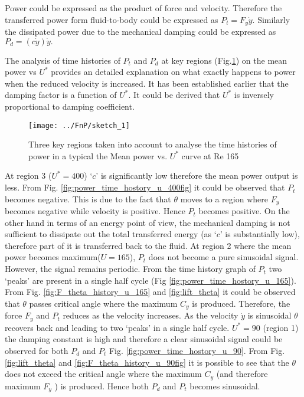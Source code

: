  
 
 
 
 Power could be expressed as the product of force and velocity. Therefore the transferred power form fluid-to-body could be expressed as $P_t=F_y\dot{y}$. Similarly the dissipated power due to the mechanical damping could be expressed as $P_d=(c\dot{y})\dot{y}.$

The analysis of time histories of $P_t $ and $P_d$ at key regions (Fig.\ref{fig:regions_1}) on the mean power vs $U^*$ provides an detailed explanation on what exactly happens to power when the reduced velocity is increased. It has been established earlier that the damping factor is a function of $U^*$. It could be derived that $U^*$ is inversely proportional to damping coefficient. 

\begin{figure}[h!]
\centering
\texttt{[image: ../FnP/sketch\_1]}
\caption{ Three key regions taken into account to analyse the time histories of power in a typical the Mean power vs. $U^*$ curve at Re 165 }
\label{fig:regions_1}
\end{figure}









At region 3 ($U^*= 400$) `$c$' is significantly low therefore the mean power output is less. From Fig. \ref{fig:power_time_hostory_u_400fig} it could be observed that $P_t$ becomes negative. This is due to the fact that $\theta$ moves to a region where $F_y$ becomes negative while velocity is positive. Hence $P_t$ becomes positive. On the other hand in terms of an energy point  of view, the mechanical damping is not sufficient to dissipate out the total transferred energy (as `$c$' is substantially low), therefore  part of it  is transferred back to the fluid. At region 2 where the  mean power becomes maximum($U=165$), $P_t$ does not become a pure sinusoidal signal. However, the  signal remains periodic. From the time history graph of $P_t$ two `peaks' are present in a single half cycle (Fig \ref{fig:power_time_hostory_u_165}). From  Fig. \ref{fig:F_theta_history_u_165} and \ref{fig:lift_theta} it could be observed that $\theta$ passes critical angle where the maximum $C_y$ is produced. Therefore, the force $F_y$ and $P_t$ reduces as the velocity increases. As the velocity $\dot{y}$ is sinusoidal $\theta$ recovers back and leading to two `peaks'  in a single half cycle.  $U^*=90$ (region 1) the damping constant is high and therefore a clear sinusoidal signal could be observed for both $P_d$ and $P_t$ Fig. \ref{fig:power_time_hostory_u_90}. From Fig. \ref{fig:lift_theta} and  \ref{fig:F_theta_history_u_90fig}  it is possible to see that the $\theta$  does not exceed the critical angle where the maximum $C_y$ (and therefore maximum $F_y$ ) is produced. Hence both $P_d$ and $P_t$ becomes sinusoidal.
  


